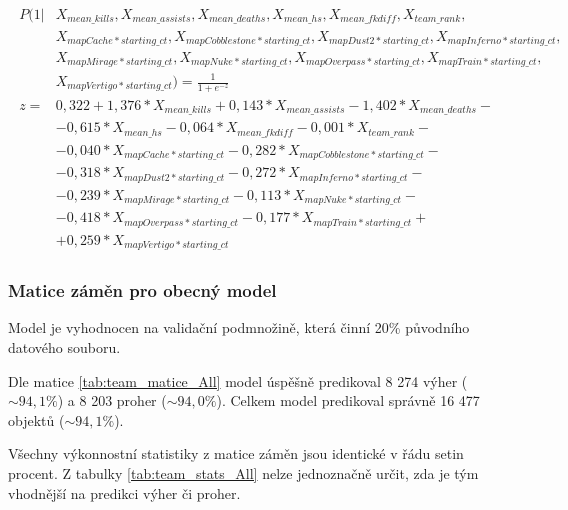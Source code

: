 \begin{align*}
    \begin{split}
        P(1 | &X_{mean\_kills}, X_{mean\_assists}, X_{mean\_deaths}, X_{mean\_hs}, X_{mean\_fkdiff}, X_{team\_rank}, \\
              &X_{mapCache*starting\_ct}, X_{mapCobblestone*starting\_ct}, X_{mapDust2*starting\_ct}, X_{mapInferno*starting\_ct}, \\
              &X_{mapMirage*starting\_ct}, X_{mapNuke*starting\_ct}, X_{mapOverpass*starting\_ct}, X_{mapTrain*starting\_ct}, \\
              &X_{mapVertigo*starting\_ct}) = \frac{1}{1 + e^{-z}} \\
        z = &0,322 + 1,376*X_{mean\_kills} + 0,143*X_{mean\_assists} - 1,402*X_{mean\_deaths} - \\
            &- 0,615*X_{mean\_hs} - 0,064*X_{mean\_fkdiff} - 0,001*X_{team\_rank} - \\
            &- 0,040*X_{mapCache*starting\_ct} - 0,282*X_{mapCobblestone*starting\_ct} - \\
            &- 0,318*X_{mapDust2*starting\_ct} - 0,272*X_{mapInferno*starting\_ct} - \\
            &- 0,239*X_{mapMirage*starting\_ct} - 0,113*X_{mapNuke*starting\_ct} - \\
            &- 0,418*X_{mapOverpass*starting\_ct} - 0,177*X_{mapTrain*starting\_ct} + \\
            &+ 0,259*X_{mapVertigo*starting\_ct}
    \end{split}
\end{align*}

\subsubsection{Matice záměn pro obecný model}
Model je vyhodnocen na validační podmnožině, která činní 20\% původního datového souboru.



Dle matice \ref{tab:team_matice_All} model úspěšně predikoval 8 274 výher ($\sim 94,1\%$) a 8 203 proher ($\sim 94,0\%$). Celkem
model predikoval správně 16 477 objektů ($\sim 94,1\%$).



Všechny výkonnostní statistiky z matice záměn jsou identické v řádu setin procent. Z tabulky \ref{tab:team_stats_All} nelze jednoznačně určit, zda je tým
vhodnější na predikci výher či proher.

